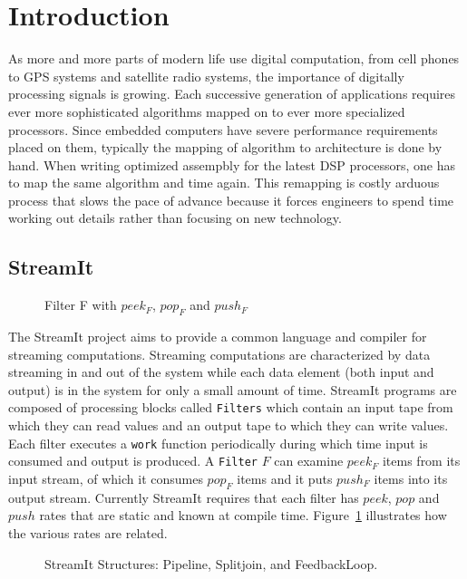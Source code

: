 \section{Introduction}
As more and more parts of modern life use digital computation, from cell phones to GPS systems
and satellite radio systems, the importance of digitally processing signals is growing.
Each successive generation of applications requires ever more sophisticated algorithms mapped 
on to ever more specialized processors. Since embedded computers have severe performance
requirements placed on them, typically the mapping of algorithm to architecture is done by hand.
When writing optimized assempbly for the latest DSP processors, one has to map the same algorithm
and time again. This remapping is costly arduous process that slows the pace of advance
because it forces engineers to spend time working out details rather than focusing on new technology.

\subsection{StreamIt}

\begin{figure}
\center
\epsfxsize=2.5in
\caption{Filter F with $peek_{F}$, $pop_{F}$ and $push_{F}$}
\label{fig:overview-filter}
\end{figure}


The StreamIt\cite{thies02streamit,thies01streamit,william-stream,michal-common} project
aims to provide a common language and compiler for streaming computations. Streaming computations
are characterized by data streaming in and out of the system while each data element (both
input and output) is in the system for only a small amount of time. 
StreamIt programs are composed of processing blocks called {\tt Filters} which
contain an input tape from which they can read values and an output tape to which
they can write values. Each filter executes a {\tt work} function periodically during which
time input is consumed and output is produced. A {\tt Filter} $F$ can examine $peek_{F}$ items 
from its input stream, of which it consumes $pop_{F}$ items and it puts $push_{F}$ items into
its output stream. Currently StreamIt requires that each filter has $peek$, $pop$ and $push$ rates
that are static and known at compile time. Figure~\ref{fig:overview-filter} illustrates how the
various rates are related.


\begin{figure}
\center
\epsfxsize=2.5in
\caption{StreamIt Structures: Pipeline, Splitjoin, and FeedbackLoop.}
\label{fig:structures}
\end{figure}


